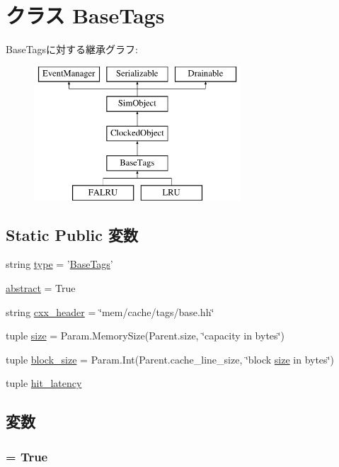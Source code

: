 \hypertarget{classTags_1_1BaseTags}{
\section{クラス BaseTags}
\label{classTags_1_1BaseTags}
}
BaseTagsに対する継承グラフ:\begin{figure}[H]
\begin{center}
\leavevmode
\includegraphics[height=5cm]{classTags_1_1BaseTags}
\end{center}
\end{figure}
\subsection*{Static Public 変数}
\begin{DoxyCompactItemize}
\item 
string \hyperlink{classTags_1_1BaseTags_acce15679d830831b0bbe8ebc2a60b2ca}{type} = '\hyperlink{classTags_1_1BaseTags}{BaseTags}'
\item 
\hyperlink{classTags_1_1BaseTags_a17fa61ac3806b481cafee5593b55e5d0}{abstract} = True
\item 
string \hyperlink{classTags_1_1BaseTags_a17da7064bc5c518791f0c891eff05fda}{cxx\_\-header} = \char`\"{}mem/cache/tags/base.hh\char`\"{}
\item 
tuple \hyperlink{classTags_1_1BaseTags_a377e5da8df1f89c5468c8b8cd07eac89}{size} = Param.MemorySize(Parent.size, \char`\"{}capacity in bytes\char`\"{})
\item 
tuple \hyperlink{classTags_1_1BaseTags_abe33528b644980a2c72742ed1df2ef5d}{block\_\-size} = Param.Int(Parent.cache\_\-line\_\-size, \char`\"{}block \hyperlink{classTags_1_1BaseTags_a377e5da8df1f89c5468c8b8cd07eac89}{size} in bytes\char`\"{})
\item 
tuple \hyperlink{classTags_1_1BaseTags_a436a0fbcd55f5b33c39cb0e4b6898d0e}{hit\_\-latency}
\end{DoxyCompactItemize}


\subsection{変数}
\hypertarget{classTags_1_1BaseTags_a17fa61ac3806b481cafee5593b55e5d0}{
\subsubsection[{abstract}]{ = True}}
\label{classTags_1_1BaseTags_a17fa61ac3806b481cafee5593b55e5d0}


